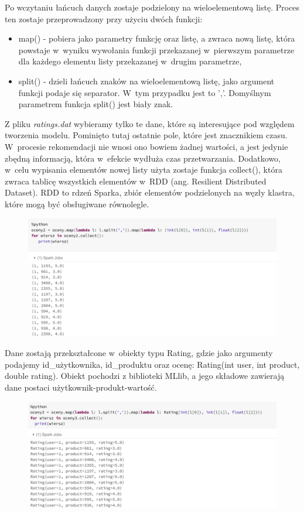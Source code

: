 \documentclass[12pt,a4paper]{report}
\begin{document}
Po wczytaniu łańcuch danych zostaje podzielony na wieloelementową listę. Proces ten zostaje przeprowadzony przy użyciu dwóch funkcji:
\begin{itemize}
\item map() - pobiera jako parametry funkcję oraz listę, a zwraca nową listę, która powstaje w~wyniku wywołania funkcji przekazanej w~pierwszym parametrze dla każdego elementu listy przekazanej w~drugim parametrze,
\item split() - dzieli łańcuch znaków na wieloelementową listę, jako argument funkcji podaje się separator. W~tym przypadku jest to ','. Domyślnym parametrem funkcja split() jest biały znak.
\end{itemize}
Z pliku \textit{ratings.dat} wybieramy tylko te dane, które są interesujące pod względem tworzenia modelu. Pominięto tutaj ostatnie pole, które jest znacznikiem czasu. W~procesie rekomendacji nie wnosi ono bowiem żadnej wartości, a jest jedynie zbędną informacją, która w~efekcie wydłuża czas przetwarzania.
Dodatkowo, w~celu wypisania elementów nowej listy użyta zostaje funkcja collect(), która zwraca tablicę wszystkich elementów w~RDD (ang. Resilient Distributed Dataset). RDD to rdzeń Sparka,  zbiór elementów podzielonych na węzły klastra, które mogą być obsługiwane równolegle.

\begin{figure}[H]
\includegraphics[scale=0.5]{obrazy/ALS3.PNG} 
\end{figure}

Dane zostają przekształcone w~obiekty typu Rating, gdzie jako argumenty podajemy id\_użytkownika, id\_produktu oraz ocenę: Rating(int user, int product, double rating). Obiekt pochodzi z biblioteki MLlib, a jego składowe zawierają dane postaci użytkownik-produkt-wartość.

\begin{figure}[H]
\includegraphics[scale=0.5]{obrazy/ALS4.PNG} 
\end{figure}
\end{document}
